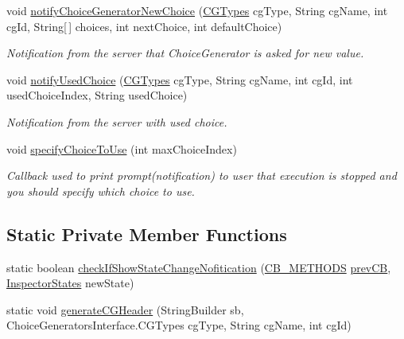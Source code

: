 \begin{DoxyCompactItemize}
void \hyperlink{classgov_1_1nasa_1_1jpf_1_1inspector_1_1client_1_1_j_p_f_client_callback_handler_ae1c072c78bfbb68ce4de206a3c41b2b3}{notify\+Choice\+Generator\+New\+Choice} (\hyperlink{enumgov_1_1nasa_1_1jpf_1_1inspector_1_1interfaces_1_1_choice_generators_interface_1_1_c_g_types}{C\+G\+Types} cg\+Type, String cg\+Name, int cg\+Id, String\mbox{[}$\,$\mbox{]} choices, int next\+Choice, int default\+Choice)
\begin{DoxyCompactList}\small\item\em Notification from the server that Choice\+Generator is asked for new value. \end{DoxyCompactList}\item 
void \hyperlink{classgov_1_1nasa_1_1jpf_1_1inspector_1_1client_1_1_j_p_f_client_callback_handler_a58681ba2362bf7babca7aafad10a653a}{notify\+Used\+Choice} (\hyperlink{enumgov_1_1nasa_1_1jpf_1_1inspector_1_1interfaces_1_1_choice_generators_interface_1_1_c_g_types}{C\+G\+Types} cg\+Type, String cg\+Name, int cg\+Id, int used\+Choice\+Index, String used\+Choice)
\begin{DoxyCompactList}\small\item\em Notification from the server with used choice. \end{DoxyCompactList}\item 
void \hyperlink{classgov_1_1nasa_1_1jpf_1_1inspector_1_1client_1_1_j_p_f_client_callback_handler_af0ae28e8ceb29e88bb9a3349511e140b}{specify\+Choice\+To\+Use} (int max\+Choice\+Index)
\begin{DoxyCompactList}\small\item\em Callback used to print prompt(notification) to user that execution is stopped and you should specify which choice to use. \end{DoxyCompactList}\end{DoxyCompactItemize}
\subsection*{Static Private Member Functions}
\begin{DoxyCompactItemize}
\item 
static boolean \hyperlink{classgov_1_1nasa_1_1jpf_1_1inspector_1_1client_1_1_j_p_f_client_callback_handler_af7484150021a40f37d478b392efe2224}{check\+If\+Show\+State\+Change\+Nofitication} (\hyperlink{enumgov_1_1nasa_1_1jpf_1_1inspector_1_1interfaces_1_1_inspector_call_backs_1_1_c_b___m_e_t_h_o_d_s}{C\+B\+\_\+\+M\+E\+T\+H\+O\+DS} \hyperlink{classgov_1_1nasa_1_1jpf_1_1inspector_1_1client_1_1_j_p_f_client_callback_handler_a1e5272638212d9246e98ced9a5a78012}{prev\+CB}, \hyperlink{enumgov_1_1nasa_1_1jpf_1_1inspector_1_1interfaces_1_1_commands_interface_1_1_inspector_states}{Inspector\+States} new\+State)
\item 
static void \hyperlink{classgov_1_1nasa_1_1jpf_1_1inspector_1_1client_1_1_j_p_f_client_callback_handler_a22353a4cf73f73eaa9c953e58700c1f3}{generate\+C\+G\+Header} (String\+Builder sb, Choice\+Generators\+Interface.\+C\+G\+Types cg\+Type, String cg\+Name, int cg\+Id)
\end{DoxyCompactItemize}

